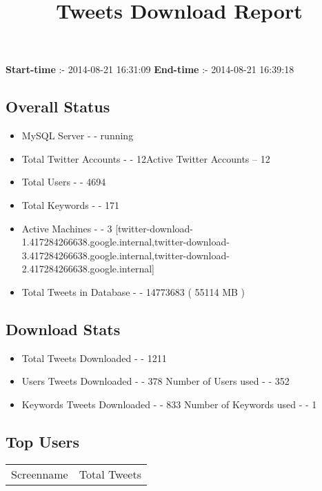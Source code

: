\documentclass{article}\usepackage[T1]{fontenc}
\begin{document}
\title{\textbf{Tweets Download Report}}
               \date{}
                \maketitle
               \centerline{\textbf{Start-time} :- 2014-08-21 16:31:09 \hspace{40pt} \textbf{End-time} :- 2014-08-21 16:39:18}               \subsection*{Overall Status}                \begin{itemize}                \item MySQL Server - - running               \item Total Twitter Accounts - - 12\newline Active Twitter Accounts -- 12               \item Total Users - - 4694               \item Total Keywords - - 171               \item Active Machines - - 3 [twitter-download-1.417284266638.google.internal,twitter-download-3.417284266638.google.internal,twitter-download-2.417284266638.google.internal]               \item Total Tweets in Database - - 14773683 ( 55114 MB )               \end{itemize}               \subsection*{Download Stats}                \begin{itemize}                \item Total Tweets Downloaded - - 1211               \item Users Tweets Downloaded - - 378 \newline Number of Users used - - 352               \item Keywords Tweets Downloaded - - 833 \newline Number of Keywords used - - 1              \end{itemize}              \subsection*{Top Users}\begin{tabular}{|c|c|}         \hline         Screenname & Total Tweets \\ 

\end{tabular}
\end{document}
